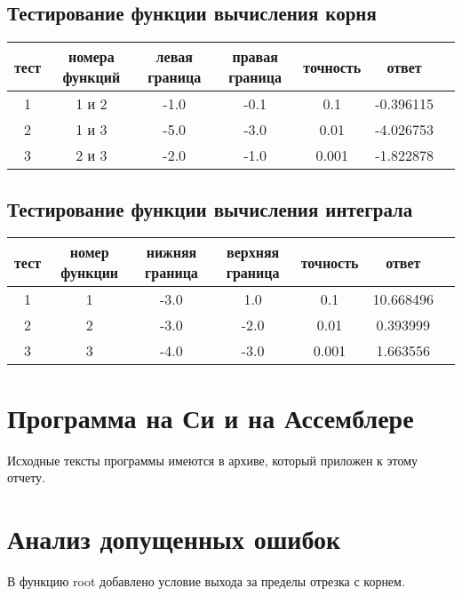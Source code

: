 \documentclass[a4paper,12pt,titlepage,finall]{article}
\begin{document}
\subsection{Тестирование функции вычисления корня}
\begin{table}[h]
\centering
\begin{tabular}{|c|c|c|c|c|c|c|}
    \hline
     тест & номера функций & левая граница & правая граница & точность & ответ \\
    \hline
     1 & 1 и 2 & -1.0 & -0.1 & 0.1 & -0.396115 \\
    \hline
     2 & 1 и 3 & -5.0 & -3.0 & 0.01 & -4.026753 \\
    \hline
     3 & 2 и 3 & -2.0 & -1.0 & 0.001 & -1.822878 \\
    \hline
\end{tabular}
\end{table}
\clearpage

\subsection{Тестирование функции вычисления интеграла}

\begin{table}[h]
\centering
\begin{tabular}{|c|c|c|c|c|c|c|}
    \hline
    тест & номер функции & нижняя граница & верхняя граница & точность & ответ \\
    \hline
     1 & 1 & -3.0 & 1.0 & 0.1  & 10.668496 \\
    \hline
     2 & 2 & -3.0 & -2.0 & 0.01  & 0.393999 \\
    \hline
     3 & 3 & -4.0 & -3.0 & 0.001  & 1.663556 \\
    \hline
\end{tabular}
\end{table}
\clearpage

\newpage

\section{Программа на Си и на Ассемблере}

Исходные тексты программы имеются в архиве, который приложен к этому отчету.

\newpage              

\section{Анализ допущенных ошибок}
В функцию root добавлено условие выхода за пределы отрезка с корнем. \par
\end{document}
